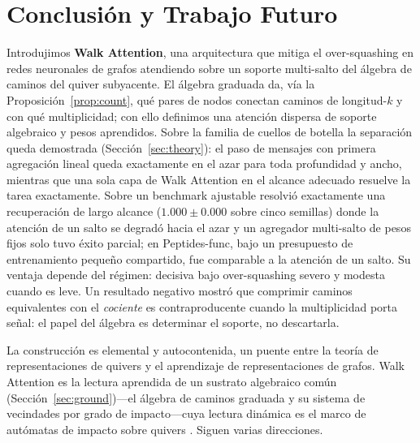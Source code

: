 \section{Conclusión y Trabajo Futuro}\label{sec:conclusion}

Introdujimos \textbf{Walk Attention}, una arquitectura que mitiga el
over-squashing en redes neuronales de grafos atendiendo sobre un soporte
multi-salto del álgebra de caminos del quiver subyacente. El álgebra graduada
da, vía la Proposición~\ref{prop:count}, qué pares de nodos conectan caminos de
longitud-$k$ y con qué multiplicidad; con ello definimos una atención dispersa
de soporte algebraico y pesos aprendidos. Sobre la familia de cuellos de
botella la separación queda demostrada (Sección~\ref{sec:theory}): el paso de
mensajes con primera agregación lineal queda exactamente en el azar para toda
profundidad y ancho, mientras que una sola capa de Walk Attention en el alcance
adecuado resuelve la tarea exactamente. Sobre un benchmark ajustable resolvió
exactamente una recuperación de largo alcance ($1.000\pm0.000$ sobre cinco
semillas) donde la atención de un salto se degradó hacia el azar y un agregador
multi-salto de pesos fijos solo tuvo éxito parcial; en Peptides-func, bajo un
presupuesto de entrenamiento pequeño compartido, fue comparable a la atención de
un salto. Su ventaja depende del régimen: decisiva
bajo over-squashing severo y modesta cuando es leve. Un resultado
negativo mostró que comprimir caminos equivalentes con el \emph{cociente} es
contraproducente cuando la multiplicidad porta señal: el papel del álgebra es
determinar el soporte, no descartarla.

La construcción es elemental y autocontenida, un puente entre la teoría de
representaciones de quivers y el aprendizaje de representaciones de grafos. Walk
Attention es la lectura aprendida de un sustrato algebraico común
(Sección~\ref{sec:ground})---el álgebra de caminos graduada y su sistema de
vecindades por grado de impacto---cuya lectura dinámica es el marco de autómatas de
impacto sobre quivers \cite{zainea2026aiq}. Siguen varias direcciones.

